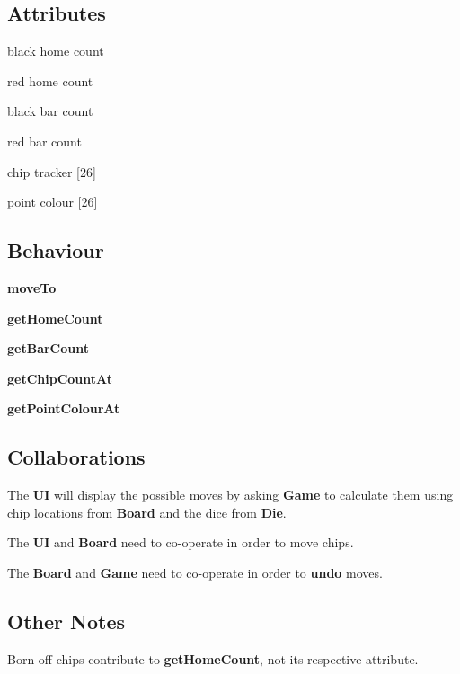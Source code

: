 \begin{multicols}{2}
    \begin{dashed}
        \subsection{Attributes}
        \item black home count
        \item red home count
        \item black bar count
        \item red bar count
        \item chip tracker [26]
        \item point colour [26]
    \end{dashed}

    \begin{dashed}
        \subsection{Behaviour}
        \item \textbf{moveTo}
        \item \textbf{getHomeCount}
        \item \textbf{getBarCount}
        \item \textbf{getChipCountAt}
        \item \textbf{getPointColourAt}
    \end{dashed}
\end{multicols}

\subsection{Collaborations}

\begin{dashed}
    \item The \textbf{UI} will display the possible moves by asking \textbf{Game} to calculate them using chip locations from \textbf{Board} and the dice from \textbf{Die}.
    \item The \textbf{UI} and \textbf{Board} need to co-operate in order to move chips.
    \item The \textbf{Board} and \textbf{Game} need to co-operate in order to \textbf{undo} moves.
\end{dashed}

\subsection{Other Notes}

\begin{dashed}
    \item Born off chips contribute to \textbf{getHomeCount}, not its respective attribute.
\end{dashed}

